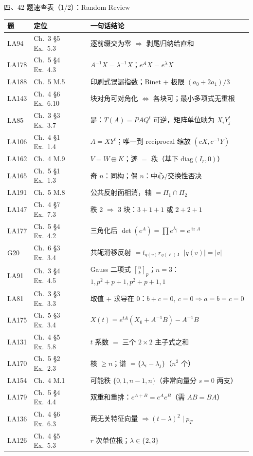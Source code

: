 \documentclass[aspectratio=169,10pt,fontset=none]{ctexbeamer}
\begin{document}
\begin{frame}[t]{四、42 题速查表（1/2）：Random Review}
  \label{sec:answers}
  \centering\scriptsize
  \setlength{\tabcolsep}{3.0pt}
  \renewcommand{\arraystretch}{0.95}
  \begin{tabular}{@{}l l l@{}}
    \toprule
    题 & 定位 & 一句话结论\\
    \midrule
    LA94 & Ch.~3 \S5 Ex.~5.3 & 逐前缀交为零 $\Rightarrow$ 剥尾归纳给直和\\
    LA178 & Ch.~5 \S4 Ex.~4.3 & $A^{-1}X=\lambda^{-1}X$；$e^AX=e^\lambda X$\\
    LA188 & Ch.~5 M.5 & 印刷式误漏指数；Binet + 极限 $(a_0{+}2a_1)/3$\\
    LA143 & Ch.~4 \S6 Ex.~6.10 & 块对角可对角化 $\iff$ 各块可；最小多项式无重根\\
    LA85 & Ch.~3 \S3 Ex.~3.7 & 是：$T(A)=PAQ^t$ 可逆，矩阵单位映为 $X_iY_j^t$\\
    LA106 & Ch.~4 \S1 Ex.~1.4 & $A=XY^t$；唯一到 reciprocal 缩放 $(cX,c^{-1}Y)$\\
    LA162 & Ch.~4 M.9 & $V=W\oplus K$；迹 $=$ 秩（基下 $\mathrm{diag}(I_r,0)$）\\
    LA165 & Ch.~5 \S1 Ex.~1.3 & 奇 $n$：同构；偶 $n$：中心/交换性否决\\
    LA191 & Ch.~5 M.8 & 公共反射面相消，轴 $=\Pi_1\cap\Pi_2$\\
    LA147 & Ch.~4 \S7 Ex.~7.3 & 秩 2 $\Rightarrow$ 3 块：$3{+}1{+}1$ 或 $2{+}2{+}1$\\
    LA177 & Ch.~5 \S4 Ex.~4.2 & 三角化后 $\det(e^A)=\prod e^{\lambda_j}=e^{\operatorname{tr}A}$\\
    G20 & Ch.~6 \S3 Ex.~3.4 & 共轭滑移反射 $=t_{q(v)}r_{g(\ell)}$，$|q(v)|=|v|$\\
    LA91 & Ch.~3 \S4 Ex.~4.5 & Gauss 二项式 ${n\brack k}_p$；$n{=}3$：$1,p^2{+}p{+}1,p^2{+}p{+}1,1$\\
    LA81 & Ch.~3 \S3 Ex.~3.3 & 取值 + 求导在 $0$：$b{+}c=0,\ c=0\Rightarrow a=b=c=0$\\
    LA175 & Ch.~5 \S3 Ex.~3.4 & $X(t)=e^{tA}(X_0{+}A^{-1}B)-A^{-1}B$\\
    LA131 & Ch.~4 \S5 Ex.~5.8 & $t$ 系数 $=$ 三个 $2\times2$ 主子式之和\\
    LA170 & Ch.~5 \S2 Ex.~2.3 & 核 $\ge n$；谱 $=\{\lambda_i-\lambda_j\}$（$n^2$ 个）\\
    LA154 & Ch.~4 M.1 & 可能秩 $\{0,1,n-1,n\}$（非常向量分 $s=0$ 两支）\\
    LA179 & Ch.~5 \S4 Ex.~4.4 & 双重和重排：$e^{A+B}=e^Ae^B$（需 $AB=BA$）\\
    LA136 & Ch.~4 \S6 Ex.~6.3 & 两无关特征向量 $\Rightarrow(t-\lambda)^2\mid p_T$\\
    LA126 & Ch.~4 \S5 Ex.~5.3 & $r$ 次单位根；$\lambda\in\{2,3\}$\\
    \bottomrule
  \end{tabular}
\end{frame}
\end{document}
